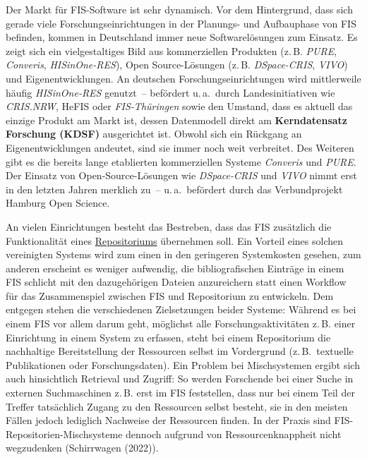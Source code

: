 \documentclass[
  11pt,
  letterpaper,
  DIV=11,
  twoside]{scrreprt}
\begin{document}
Der Markt für {FIS}-Software ist sehr dynamisch. Vor dem Hintergrund,
dass sich gerade viele Forschungseinrichtungen in der Planungs- und
Aufbauphase von {FIS} befinden, kommen in Deutschland immer neue
Softwarelösungen zum Einsatz. Es zeigt sich ein vielgestaltiges Bild aus
kommerziellen Produkten (z.\,B. \emph{PURE}, \emph{Converis},
\emph{HISinOne-RES}), Open Source-Lösungen (z.\,B. \emph{DSpace-CRIS},
\emph{VIVO}) und Eigenentwicklungen. An deutschen
Forschungseinrichtungen wird mittlerweile häufig \emph{HISinOne-RES}
genutzt~-- befördert u.\,a.~durch Landesinitiativen wie \emph{CRIS.NRW},
HeFIS oder \emph{FIS-Thüringen} sowie den Umstand, dass es aktuell das
einzige Produkt am Markt ist, dessen Datenmodell direkt am
\textbf{Kerndatensatz Forschung ({KDSF})} ausgerichtet ist. Obwohl sich
ein Rückgang an Eigenentwicklungen andeutet, sind sie immer noch weit
verbreitet. Des Weiteren gibt es die bereits lange etablierten
kommerziellen Systeme \emph{Converis} und \emph{PURE}. Der Einsatz von
Open-Source-Lösungen wie \emph{DSpace-CRIS} und \emph{VIVO} nimmt erst
in den letzten Jahren merklich zu~-- u.\,a.~befördert durch das
Verbundprojekt Hamburg Open Science.

An vielen Einrichtungen besteht das Bestreben, dass das {FIS} zusätzlich
die Funktionalität eines
\hyperref[repositorien-fuxfcr-forschungsergebnisse]{Repositoriums}
übernehmen soll. Ein Vorteil eines solchen vereinigten Systems wird zum
einen in den geringeren Systemkosten gesehen, zum anderen erscheint es
weniger aufwendig, die bibliografischen Einträge in einem {FIS} schlicht
mit den dazugehörigen Dateien anzureichern statt einen Workflow für das
Zusammenspiel zwischen {FIS} und Repositorium zu entwickeln. Dem
entgegen stehen die verschiedenen Zielsetzungen beider Systeme: Während
es bei einem {FIS} vor allem darum geht, möglichst alle
Forschungsaktivitäten z.\,B. einer Einrichtung in einem System zu
erfassen, steht bei einem Repositorium die nachhaltige Bereitstellung
der Ressourcen selbst im Vordergrund (z.\,B.~textuelle Publikationen
oder Forschungsdaten). Ein Problem bei Mischsystemen ergibt sich auch
hinsichtlich Retrieval und Zugriff: So werden Forschende bei einer Suche
in externen Suchmaschinen z.\,B. erst im {FIS} feststellen, dass nur bei
einem Teil der Treffer tatsächlich Zugang zu den Ressourcen selbst
besteht, sie in den meisten Fällen jedoch lediglich Nachweise der
Ressourcen finden. In der Praxis sind {FIS}-Repositorien-Mischsysteme
dennoch aufgrund von Ressourcenknappheit nicht wegzudenken (Schirrwagen
(2022)).
\end{document}
